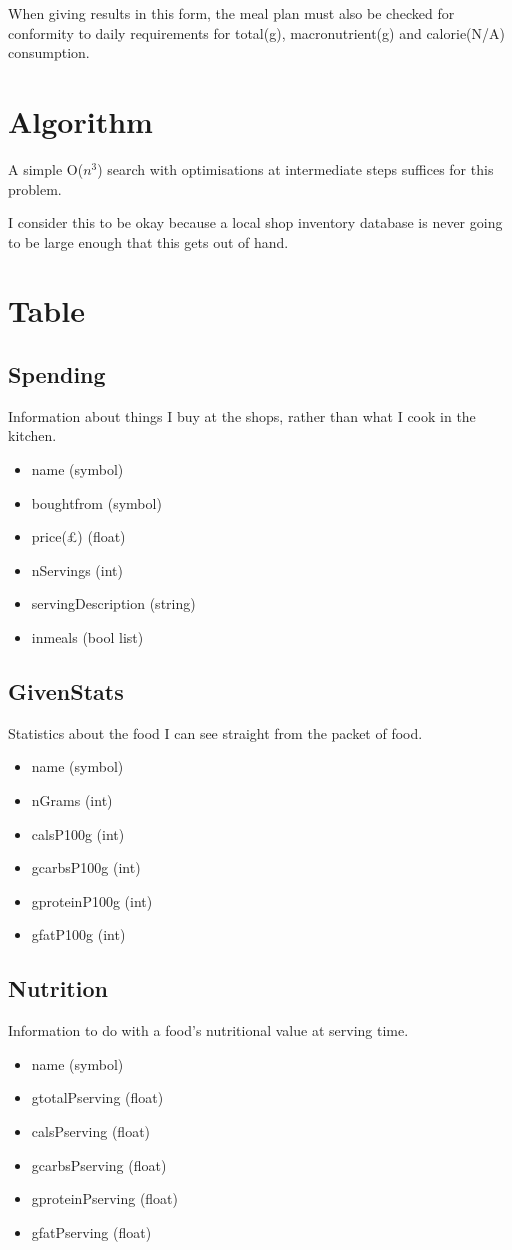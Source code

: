 \documentclass[a4paper]{article}
\begin{document}
When giving results in this form, the meal plan must also be checked for 
conformity to daily requirements for total(g), macronutrient(g) and 
calorie(N/A) consumption.

\section{Algorithm}

A simple O($n^{3}$) search with optimisations at intermediate steps suffices 
for this problem.

I consider this to be okay because a local shop inventory database is 
never going to be large enough that this gets out of hand.

\section{Table}

\subsection{Spending}

Information about things I buy at the shops, rather than what I cook in the 
kitchen.

\begin{itemize}
  \item name (symbol)
  \item boughtfrom (symbol)
  \item price(£) (float)
  \item nServings (int)
  \item servingDescription (string)
  \item inmeals (bool list)
\end{itemize}

\subsection{GivenStats}

Statistics about the food I can see straight from the packet of food.

\begin{itemize}
  \item name (symbol)
  \item nGrams (int)
  \item calsP100g (int)
  \item gcarbsP100g (int)
  \item gproteinP100g (int)
  \item gfatP100g (int)
\end{itemize} 
  
\subsection{Nutrition}

Information to do with a food's nutritional value at serving time.

\begin{itemize}
  \item name (symbol)
  \item gtotalPserving (float)
  \item calsPserving (float)
  \item gcarbsPserving (float)
  \item gproteinPserving (float)
  \item gfatPserving (float)
\end{itemize}
\end{document}
